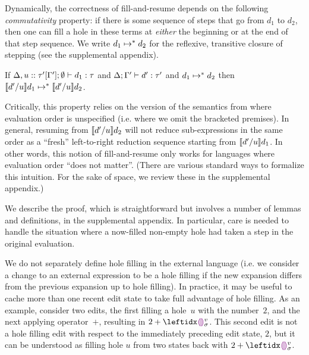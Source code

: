 Dynamically, the correctness of fill-and-resume depends on
the following \emph{commutativity} property: if there is some sequence of
steps that go from $d_1$ to $d_2$, then one can fill a hole in these
terms at \emph{either} the beginning or at the end of that step
sequence.
%
We write $d_1 \mapsto^* d_2$ for the reflexive,
transitive closure of stepping (see the supplemental appendix).
%
\begin{thm}[Commutativity]
  If $\Delta, u :: \tau'[\Gamma']; \emptyset \vdash d_1 : \tau$
  and $\Delta; \Gamma' \vdash d' : \tau'$ and $d_1 \mapsto^* d_2$
  then $\llbracket d' / u\rrbracket d_1 \mapsto^* \llbracket d' / u\rrbracket d_2$.
\end{thm}
%
Critically, this property relies on the version of
the semantics from  where evaluation order is
unspecified (i.e. where we omit the bracketed premises).
%
In general, resuming from $\llbracket d' / u\rrbracket d_2$ will not
reduce sub-expressions in the same order as a ``fresh'' left-to-right
reduction sequence starting from $\llbracket d' / u\rrbracket d_1$.
%
In other words, this notion of fill-and-resume only works for
languages where evaluation order ``does not matter''.
(There are various standard ways to formalize this intuition.
For the sake of space, we review these in the supplemental appendix.)


We describe the proof, which is straightforward but involves a
number of lemmas and definitions, in the supplemental appendix.
%
In particular, care is needed to handle the situation where a
now-filled non-empty hole had taken a step in the original evaluation.


We do not separately define hole filling in the external language
(i.e. we consider a change to an external expression to be a hole filling if the new expansion differs from
the previous expansion up to hole filling).
In practice, it may be useful to cache more than one recent edit state
to take full advantage of hole filling.
As an example, consider two edits, the first filling a hole~$u$ with
the number~$2$, and the next applying operator~$+$, resulting in $2
+ \dehole{v}{\sigma}{}$.
%
This second edit is not a hole filling edit with respect to the
immediately preceding edit state, $2$, but it can be understood as filling
hole $u$ from two states back with $2 + \dehole{v}{\sigma}{}$.


